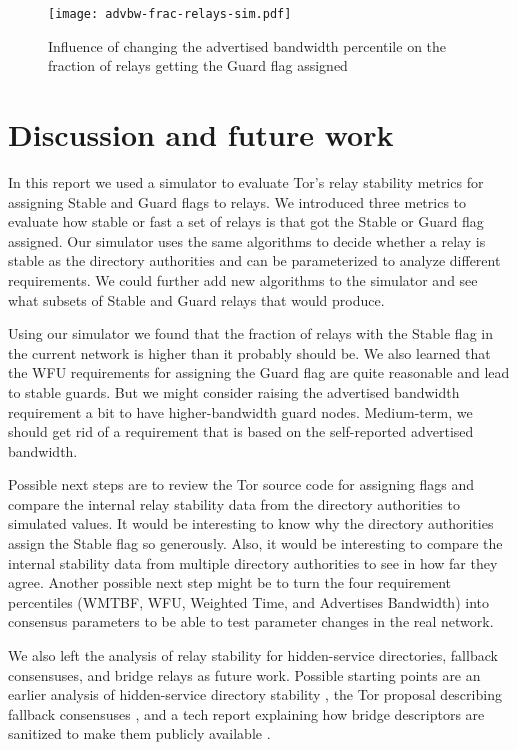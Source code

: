 \documentclass{article}
\begin{document}
\begin{figure}[t]
\texttt{[image: advbw-frac-relays-sim.pdf]}
\caption{Influence of changing the advertised bandwidth percentile on the
fraction of relays getting the Guard flag assigned}
\label{fig:advbw-frac-relays-sim}
\end{figure}

\section{Discussion and future work}

In this report we used a simulator to evaluate Tor's relay stability
metrics for assigning Stable and Guard flags to relays.
We introduced three metrics to evaluate how stable or fast a set of relays
is that got the Stable or Guard flag assigned.
Our simulator uses the same algorithms to decide whether a relay is stable
as the directory authorities and can be parameterized to analyze different
requirements.
We could further add new algorithms to the simulator and see what subsets
of Stable and Guard relays that would produce.

Using our simulator we found that the fraction of relays with the Stable
flag in the current network is higher than it probably should be.
We also learned that the WFU requirements for assigning the Guard flag are
quite reasonable and lead to stable guards.
But we might consider raising the advertised bandwidth requirement a bit
to have higher-bandwidth guard nodes.
Medium-term, we should get rid of a requirement that is based on the
self-reported advertised bandwidth.

Possible next steps are to review the Tor source code for assigning flags
and compare the internal relay stability data from the directory
authorities to simulated values.
It would be interesting to know why the directory authorities assign the
Stable flag so generously.
Also, it would be interesting to compare the internal stability data from
multiple directory authorities to see in how far they agree.
Another possible next step might be to turn the four requirement
percentiles (WMTBF, WFU, Weighted Time, and Advertises Bandwidth) into
consensus parameters to be able to test parameter changes in the real
network.

We also left the analysis of relay stability for hidden-service
directories, fallback consensuses, and bridge relays as future work.
Possible starting points are an earlier analysis of hidden-service
directory stability \cite{loesing2009thesis}, the Tor proposal
describing fallback consensuses \cite{proposal146}, and a tech report
explaining how bridge descriptors are sanitized to make them publicly
available \cite{loesing2011overview}.



\end{document}
